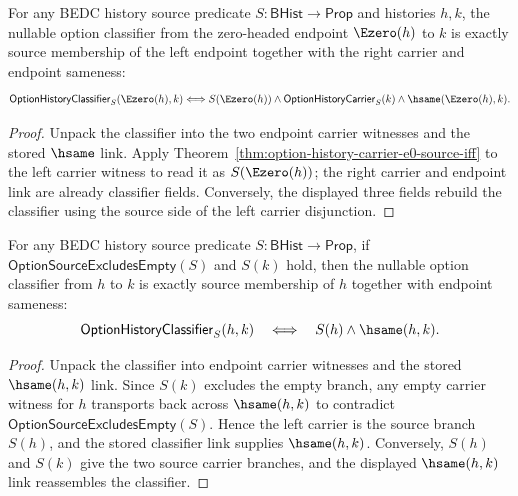 \begin{theorem}
\label{thm:option-history-classifier-e0-left-source-iff}
For any BEDC history source predicate $S:\mathsf{BHist}\to\mathsf{Prop}$ and
histories $h,k$, the nullable option classifier from the zero-headed endpoint
$\Ezero(h)$ to $k$ is exactly source membership of the left endpoint together
with the right carrier and endpoint sameness:
$$
\mathsf{OptionHistoryClassifier}_S(\Ezero(h),k)
\Longleftrightarrow
S(\Ezero(h))\land\mathsf{OptionHistoryCarrier}_S(k)\land
\hsame(\Ezero(h),k).
$$
\end{theorem}
\begin{proof}
Unpack the classifier into the two endpoint carrier witnesses and the stored
$\hsame$ link. Apply
Theorem~\ref{thm:option-history-carrier-e0-source-iff} to the left carrier
witness to read it as $S(\Ezero(h))$; the right carrier and endpoint link are
already classifier fields. Conversely, the displayed three fields rebuild the
classifier using the source side of the left carrier disjunction.
\end{proof}

\begin{theorem}
\label{thm:option-history-classifier-source-right-exactness}
For any BEDC history source predicate $S:\mathsf{BHist}\to\mathsf{Prop}$,
if $\mathsf{OptionSourceExcludesEmpty}(S)$ and $S(k)$ hold, then the nullable
option classifier from $h$ to $k$ is exactly source membership of $h$ together
with endpoint sameness:
$$
\mathsf{OptionHistoryClassifier}_S(h,k)
\quad\Longleftrightarrow\quad
S(h)\land\hsame(h,k).
$$
\end{theorem}
\begin{proof}
Unpack the classifier into endpoint carrier witnesses and the stored
$\hsame(h,k)$ link. Since $S(k)$ excludes the empty branch, any empty carrier
witness for $h$ transports back across $\hsame(h,k)$ to contradict
$\mathsf{OptionSourceExcludesEmpty}(S)$. Hence the left carrier is the source
branch $S(h)$, and the stored classifier link supplies $\hsame(h,k)$. Conversely,
$S(h)$ and $S(k)$ give the two source carrier branches, and the displayed
$\hsame(h,k)$ link reassembles the classifier.
\end{proof}

